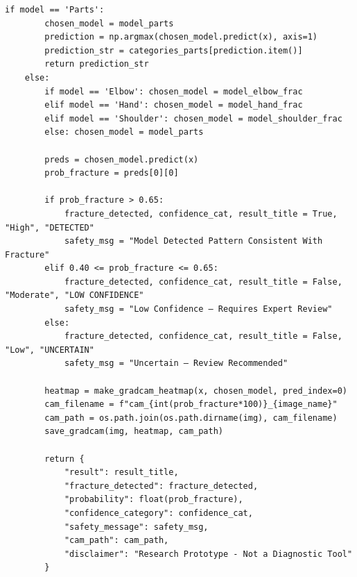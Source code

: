 \documentclass[a4paper,12pt]{report}
\begin{document}
\begin{lstlisting}[style=pythonstyle]
    if model == 'Parts':
        chosen_model = model_parts
        prediction = np.argmax(chosen_model.predict(x), axis=1)
        prediction_str = categories_parts[prediction.item()]
        return prediction_str
    else:
        if model == 'Elbow': chosen_model = model_elbow_frac
        elif model == 'Hand': chosen_model = model_hand_frac
        elif model == 'Shoulder': chosen_model = model_shoulder_frac
        else: chosen_model = model_parts

        preds = chosen_model.predict(x)
        prob_fracture = preds[0][0]
        
        if prob_fracture > 0.65:
            fracture_detected, confidence_cat, result_title = True, "High", "DETECTED"
            safety_msg = "Model Detected Pattern Consistent With Fracture"
        elif 0.40 <= prob_fracture <= 0.65:
            fracture_detected, confidence_cat, result_title = False, "Moderate", "LOW CONFIDENCE"
            safety_msg = "Low Confidence — Requires Expert Review"
        else:
            fracture_detected, confidence_cat, result_title = False, "Low", "UNCERTAIN"
            safety_msg = "Uncertain — Review Recommended"
            
        heatmap = make_gradcam_heatmap(x, chosen_model, pred_index=0)
        cam_filename = f"cam_{int(prob_fracture*100)}_{image_name}"
        cam_path = os.path.join(os.path.dirname(img), cam_filename)
        save_gradcam(img, heatmap, cam_path)

        return {
            "result": result_title,
            "fracture_detected": fracture_detected,
            "probability": float(prob_fracture),
            "confidence_category": confidence_cat,
            "safety_message": safety_msg,
            "cam_path": cam_path,
            "disclaimer": "Research Prototype - Not a Diagnostic Tool"
        }
    \end{lstlisting}
\end{document}
